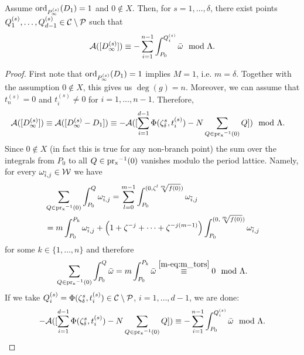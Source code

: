 \documentclass[main.tex]{subfiles}
\begin{document}
  \begin{thm}\label{thm:ajm_inf_ord1}
    Assume $\operatorname{ord}_{P_{\infty}^{(s)}}(D_1) = 1$ and $0 \not\in X$. Then, for $s = 1,\dots,\delta$, there exist points $Q_1^{(s)},\dots,Q_{d-1}^{(s)} \in \mathcal{C} \setminus \mathcal{P}$ such that
    \begin{equation}\label{eq:ajm_inf_ord1}
       \mathcal{A}( [D_{\infty}^{(s)}] ) \equiv -\sum_{i = 1}^{n-1} \int_{P_0}^{Q_i^{(s)}} \bar{\omega} \mod \Lambda.
    \end{equation}
  \end{thm}
  \begin{proof}
    First note that $\operatorname{ord}_{P_{\infty}^{(s)}}(D_1) = 1$ implies $M = 1$, i.e. $m = \delta$. Together with the assumption
    $0 \not\in X$, this gives us $\deg(g) = n$.
    Moreover, we can assume that $t_n^{(s)} = 0$ and $t_i^{(s)} \ne 0$ for $i=1,\dots,n-1$.
    Therefore,
    \begin{align*}
      \mathcal{A}( [D_{\infty}^{(s)}] )  & \equiv  \mathcal{A}([D_{\infty}^{(s)} - D_1])
      \equiv  -\mathcal{A}( [\sum_{i = 1}^{d-1} \Phi(\zeta_{\delta}^s,t_i^{(s)}) - N \sum_{Q \in \operatorname{pr_x}^{-1}(0)} Q  ] )
       \mod \Lambda.
    \end{align*}
    Since  $0 \not\in X$ (in fact this is true for any non-branch point) the sum over the integrals from $P_0$ to all $Q \in \operatorname{pr_x}^{-1}(0)$ vanishes modulo the period lattice.
    Namely, for every $\omega_{\tilde{i},j} \in \mathcal{W}$ we have
    \begin{align*}
      & \sum_{Q \in \operatorname{pr_x}^{-1}(0)} \int_{P_0}^Q \omega_{\tilde{i},j} =  \sum_{l=0}^{m-1} \int_{P_0}^{(0,\zeta^l \sqrt[m]{f(0)})} \omega_{\tilde{i},j} \\
    & = m \int_{P_0}^{P_k} \omega_{\tilde{i},j} + \left(1 + \zeta^{-j} + \dots + \zeta^{-j(m-1)}\right) \int_{P_0}^{(0,\sqrt[m]{f(0)})} \omega_{\tilde{i},j}
    \end{align*}
    for some $k \in \{1,\dots,n\}$ and therefore
    \begin{equation*}
       \sum_{Q \in \operatorname{pr_x}^{-1}(0)} \int_{P_0}^Q \bar{\omega} =  m \int_{P_0}^{P_k} \bar{\omega} \overset{\eqref{m-eq:m_tors}}{\equiv} 0 \mod \Lambda.
    \end{equation*}
    If we take $Q_i^{(s)} = \Phi(\zeta_{\delta}^s,t_i^{(s)}) \in \mathcal{C} \setminus \mathcal{P}$, $i = 1,\dots,d-1$, we are done:
    \begin{align*}
    -\mathcal{A}( [\sum_{i = 1}^{d-1} \Phi(\zeta_{\delta}^s,t_i^{(s)}) - N \sum_{Q \in \operatorname{pr_x}^{-1}(0)} Q ] ) \equiv
    -\sum_{i = 1}^{n-1} \int_{P_0}^{Q_i^{(s)}} \bar{\omega} \mod \Lambda.
    \end{align*}
     \end{proof}
\end{document}
